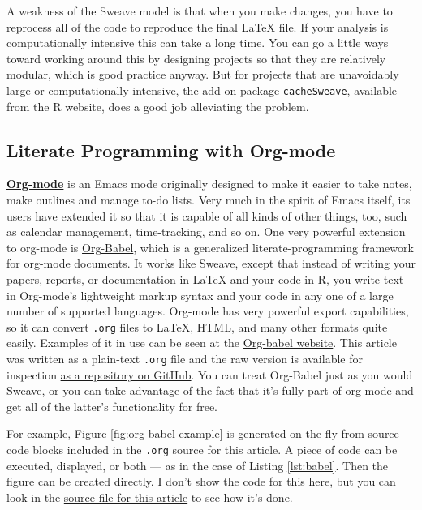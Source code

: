 \documentclass[11pt,article,oneside]{memoir}
\begin{document}
A weakness of the Sweave model is that when you make changes, you have
to reprocess all of the code to reproduce the final \LaTeX{} file. If
your analysis is computationally intensive this can take a long
time. You can go a little ways toward working around this by designing
projects so that they are relatively modular, which is good practice
anyway. But for projects that are unavoidably large or computationally
intensive, the add-on package \texttt{cacheSweave}, available from the R
website, does a good job alleviating the problem.

\subsection*{Literate Programming with Org-mode}
\label{sec-6_2}

\textbf{\href{http://orgmode.org/}{Org-mode}} is an Emacs mode
originally designed to make it easier to take notes, make outlines and
manage to-do lists. Very much in the spirit of Emacs itself, its users
have extended it so that it is capable of all kinds of other things,
too, such as calendar management, time-tracking, and so on. One very
powerful extension to org-mode is
\href{http://orgmode.org/worg/org-contrib/babel/}{Org-Babel}, which is
a generalized literate-programming framework for org-mode
documents. It works like Sweave, except that instead of writing your
papers, reports, or documentation in \LaTeX{} and your code in R, you
write text in Org-mode's lightweight markup syntax and your code in
any one of a large number of supported languages. Org-mode has very
powerful export capabilities, so it can convert \texttt{.org} files to
\LaTeX{}, HTML, and many other formats quite easily. Examples of it in
use can be seen at the
\href{http://orgmode.org/worg/org-contrib/babel/intro.html}{Org-babel
  website}.  This article was written as a plain-text \texttt{.org}
file and the raw version is available for inspection
\href{https://github.com/kjhealy/workflow-paper}{as a repository on
  GitHub}. You can treat Org-Babel just as you would Sweave, or you
can take advantage of the fact that it's fully part of org-mode and
get all of the latter's functionality for free.

For example, Figure \ref{fig:org-babel-example} is generated on the
fly from source-code blocks included in the \texttt{.org} source for
this article. A piece of code can be executed, displayed, or both ---
as in the case of Listing \ref{lst:babel}. Then the figure can be
created directly. I don't show the code for this here, but you can
look in the \href{https://github.com/kjhealy/workflow-paper}{source
  file for this article} to see how it's done.
\end{document}
